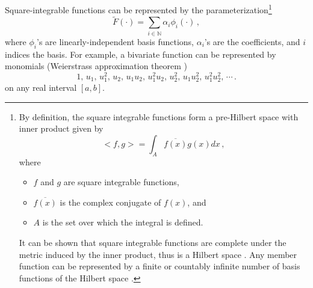 Square-integrable functions
can be represented by the parameterization\footnote{
    By definition, the square 
    integrable functions form a pre-Hilbert space with inner product given by
    $$<f,g> = \int_A \overline{f(x)}g(x) dx\,,$$ where 
    \begin{itemize}
        \item $f$ and $g$ are square integrable functions,
        \item $\overline{f(x)}$ is the complex conjugate of $f(x)$, and
        \item $A$ is the set over which the integral is defined.
    \end{itemize}
    It can be shown that square integrable functions are complete 
    under the metric induced by the inner product, thus is a Hilbert space \cite{functional analysis}.
    Any member function can be represented by 
    a finite or countably infinite number of basis functions of the Hilbert space
    \cite{functional analysis}.
} \cite{functional analysis}
\begin{equation}
    \tilde{F}(\cdot) = \sum_{i\in \mathbb{N}} {\alpha_i} \phi_i(\cdot)\,,
    \label{eqn: linear param general}
\end{equation}
where $\phi_i$'s are linearly-independent basis functions, $\alpha_i$'s are the coefficients, and $i$
indices the basis. For example, 
a bivariate function can be represented by monomials (Weierstrass approximation 
theorem \cite{functional analysis})
\begin{equation*}
    1,\,  u_1,\, u_1^2,\,
    u_2,\, u_1 u_2,\,  u_1^2 u_2, \,
    u_2^2,\,  u_1 u_2^2,\,  u_1^2 u_2^2,\, \cdots\,.
\end{equation*}
on any real interval $[a,b]$.\\

